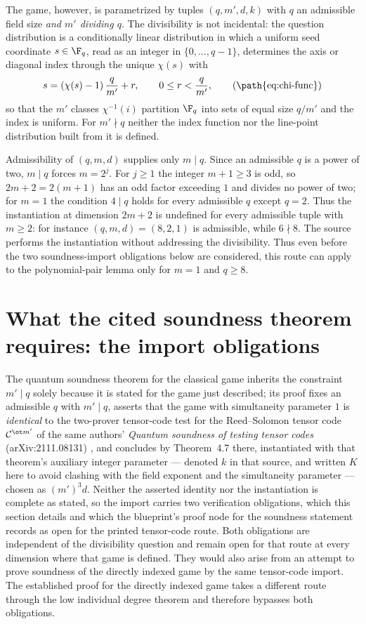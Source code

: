 \documentclass[11pt]{article}
\begin{document}
The game, however, is parametrized by tuples $(q,m',d,k)$ with $q$ an
admissible field size \emph{and $m'$ dividing $q$}.  The divisibility is not
incidental: the question distribution is a conditionally linear distribution
in which a uniform seed coordinate $s \in \F_q$, read as an integer in
$\{0,\ldots,q-1\}$, determines the axis or diagonal index through the unique
$\chi(s)$ with
\[
  s = (\chi(s)-1)\,\frac{q}{m'} + r, \qquad 0 \le r < \frac{q}{m'},
  \tag{\path{eq:chi-func}}
\]
so that the $m'$ classes $\chi^{-1}(i)$ partition $\F_q$ into sets of equal
size $q/m'$ and the index is uniform.  For $m' \nmid q$ neither the index
function nor the line-point distribution built from it is defined.

Admissibility of $(q,m,d)$ supplies only $m \mid q$.  Since an admissible $q$
is a power of two, $m \mid q$ forces $m = 2^j$.  For $j \ge 1$ the integer
$m+1 \ge 3$ is odd, so $2m+2 = 2(m+1)$ has an odd factor exceeding $1$ and
divides no power of two; for $m = 1$ the condition $4 \mid q$ holds for every
admissible $q$ except $q = 2$.  Thus the instantiation at dimension $2m+2$ is
undefined for every admissible tuple with $m \ge 2$: for instance
$(q,m,d) = (8,2,1)$ is admissible, while $6 \nmid 8$.  The source performs
the instantiation without addressing the divisibility.  Thus even before the
two soundness-import obligations below are considered, this route can apply to
the polynomial-pair lemma only for $m = 1$ and $q \ge 8$.

\section{What the cited soundness theorem requires: the import obligations}
\label{sec:import-obligations}

The quantum soundness theorem for the classical game inherits the constraint
$m' \mid q$ solely because it is stated for the game just described; its
proof fixes an admissible $q$ with $m' \mid q$, asserts that the game with
simultaneity parameter $1$ is \emph{identical} to the two-prover tensor-code
test for the Reed--Solomon tensor code $\mathcal C^{\ot m'}$ of the same
authors' \emph{Quantum soundness of testing tensor codes} (arXiv:2111.08131)
\cite{Ji2021Quantum}, and concludes by Theorem~4.7 there, instantiated with
that theorem's auxiliary integer parameter --- denoted $k$ in that source,
and written $K$ here to avoid clashing with the field exponent and the
simultaneity parameter --- chosen as $(m')^3 d$.  Neither
the asserted identity nor the instantiation is complete as stated, so the
import carries two verification obligations, which this section details and
which the blueprint's proof node for the soundness statement records as
open for the printed tensor-code route. Both obligations are independent of
the divisibility question and remain open for that route at every dimension
where that game is defined.  They would also arise from an attempt to prove
soundness of the directly indexed game by the same tensor-code import.  The
established proof for the directly indexed game takes a different route through
the low individual degree theorem and therefore bypasses both obligations.
\end{document}
